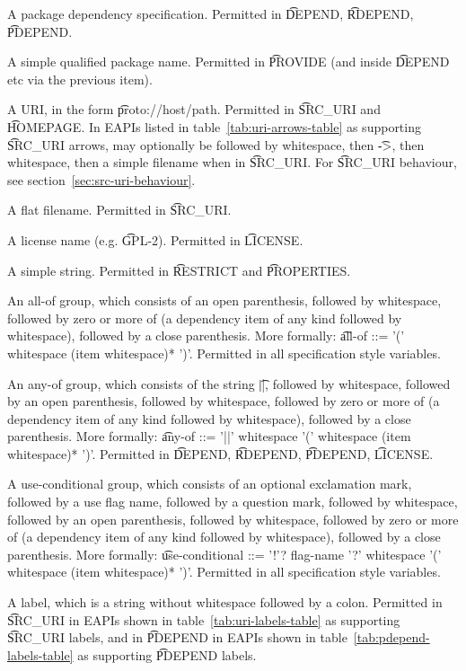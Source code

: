 \begin{compactitem}
\item A package dependency specification. Permitted in \t{DEPEND}, \t{RDEPEND}, \t{PDEPEND}.
\item A simple qualified package name. Permitted in \t{PROVIDE} (and inside \t{DEPEND} etc
    via the previous item).
\item A URI, in the form \t{proto://host/path}. Permitted in \t{SRC\_URI} and \t{HOMEPAGE}.
In EAPIs listed in table~\ref{tab:uri-arrows-table} as supporting \t{SRC\_URI} arrows, may
optionally be followed by whitespace, then \t{->}, then whitespace, then a simple filename
when in \t{SRC\_URI}. For \t{SRC\_URI} behaviour, see section~\ref{sec:src-uri-behaviour}.
\item A flat filename. Permitted in \t{SRC\_URI}.
\item A license name (e.g. \t{GPL-2}). Permitted in \t{LICENSE}.
\item A simple string. Permitted in \t{RESTRICT} and \t{PROPERTIES}.
\item An all-of group, which consists of an open parenthesis, followed by whitespace,
    followed by zero or more of (a dependency item of any kind followed by whitespace), followed
    by a close parenthesis. More formally:
    \t{all-of ::= '(' whitespace (item whitespace)* ')'}. Permitted in all specification style
    variables.
\item An any-of group, which consists of the string \t{||}, followed by whitespace,
    followed by an open parenthesis, followed by whitespace, followed by zero or more
    of (a dependency item of any kind followed by whitespace), followed by a close parenthesis.
    More formally: \t{any-of ::= '||' whitespace '(' whitespace (item whitespace)* ')'}.
    Permitted in \t{DEPEND}, \t{RDEPEND}, \t{PDEPEND}, \t{LICENSE}.
\item A use-conditional group, which consists of an optional exclamation mark, followed by
    a use flag name, followed by a question mark, followed by whitespace, followed by
    an open parenthesis, followed by whitespace, followed by zero or more of (a dependency item
    of any kind followed by whitespace), followed by a close parenthesis. More formally:
    \t{use-conditional ::= '!'? flag-name '?' whitespace '(' whitespace (item whitespace)* ')'}.
    Permitted in all specification style variables.
\IFKDEBUILDELSE
{
    \item A label, which is a string without whitespace followed by a colon. Permitted in
    \t{SRC\_URI} in EAPIs shown in table~\ref{tab:uri-labels-table} as supporting \t{SRC\_URI} labels,
    and in \t{PDEPEND} in EAPIs shown in table~\ref{tab:pdepend-labels-table} as supporting \t{PDEPEND}
    labels.
}{
}
\end{compactitem}

